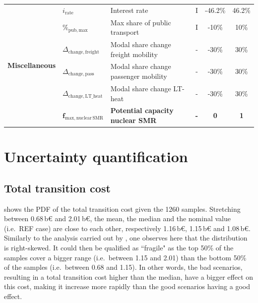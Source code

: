 \documentclass[11pt,twoside,a4paper,english]{article}
\def\ie{i.e.\ }
\begin{document}
\begin{appendices}
\begin{table}[htbp]
{\begin{tabular}{l l l c c c}
\multirow{6}{*}{\textbf{Miscellaneous}} &$i_{\mathrm{rate}}$  & Interest rate & I & -46.2\% & 46.2\% \\
& $\%_{\mathrm{pub,max}}$ & Max share of public transport & I & -10\% & 10\% \\
& $\Delta_{\mathrm{change,freight}}$ & Modal share change freight mobility & - & -30\% & 30\% \\
& $\Delta_{\mathrm{change,pass}}$ & Modal share change passenger mobility & - & -30\% & 30\% \\
& $\Delta_{\mathrm{change,LT\_heat}}$ & Modal share change LT-heat & - & -30\% & 30\% \\
& $\bm{f_{\mathrm{max,nuclear\,SMR}}}$ & \textbf{Potential capacity nuclear SMR} & \textbf{-} & \textbf{0} & \textbf{1} \\

\bottomrule							

\end{tabular}}
\end{table}

\section{Uncertainty quantification}
\label{app:UQ}
\subsection{Total transition cost}
\label{app:UQ_transition_cost}

 shows the \gls{PDF} of the total transition cost given the 1260 samples. Stretching between 0.68\,b€ and 2.01\,b€, the mean, the median and the nominal value (\ie REF case) are close to each other, respectively 1.16\,b€, 1.15\,b€ and 1.08\,b€. Similarly to the analysis carried out by \citet{coppitters2023optimizing}, one observes here that the distribution is right-skewed. It could then be qualified as ``fragile" as the top 50\% of the samples cover a bigger range (\ie between 1.15 and 2.01) than the bottom 50\% of the samples (\ie between 0.68 and 1.15). In other words, the bad scenarios, resulting in a total transition cost higher than the median, have a bigger effect on this cost, making it increase more rapidly than the good scenarios having a good effect.


\end{appendices}
\end{document}
